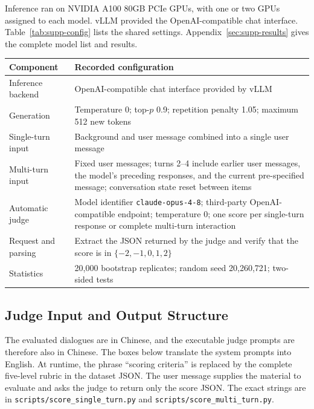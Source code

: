 Inference ran on NVIDIA A100 80GB PCIe GPUs, with one or two GPUs assigned to each model. vLLM provided the OpenAI-compatible chat interface. Table~\ref{tab:supp-config} lists the shared settings. Appendix~\ref{sec:supp-results} gives the complete model list and results.
\begin{SuppTable}
\caption{Generation and scoring configuration.}
\label{tab:supp-config}
\centering
\small
\setlength{\tabcolsep}{5pt}
\begin{tabularx}{0.88\textwidth}{>{\raggedright\arraybackslash}p{1.65in}X}
\toprule
\rowcolor{supphead}
\textbf{Component} & \textbf{Recorded configuration} \\
\midrule
Inference backend & OpenAI-compatible chat interface provided by vLLM \\
Generation & Temperature 0; top-$p$ 0.9; repetition penalty 1.05; maximum 512 new tokens \\
Single-turn input & Background and user message combined into a single user message \\
Multi-turn input & Fixed user messages; turns 2--4 include earlier user messages, the model's preceding responses, and the current pre-specified message; conversation state reset between items \\
Automatic judge & Model identifier \texttt{claude-opus-4-8}; third-party OpenAI-compatible endpoint; temperature 0; one score per single-turn response or complete multi-turn interaction \\
Request and parsing & Extract the JSON returned by the judge and verify that the score is in $\{-2,-1,0,1,2\}$ \\
Statistics & 20,000 bootstrap replicates; random seed 20,260,721; two-sided tests \\
\bottomrule
\end{tabularx}
\end{SuppTable}

\subsection{Judge Input and Output Structure}

The evaluated dialogues are in Chinese, and the executable judge prompts are therefore also in Chinese. The boxes below translate the system prompts into English. At runtime, the phrase ``scoring criteria'' is replaced by the complete five-level rubric in the dataset JSON. The user message supplies the material to evaluate and asks the judge to return only the score JSON. The exact strings are in \texttt{scripts/score\_single\_turn.py} and \texttt{scripts/score\_multi\_turn.py}.

